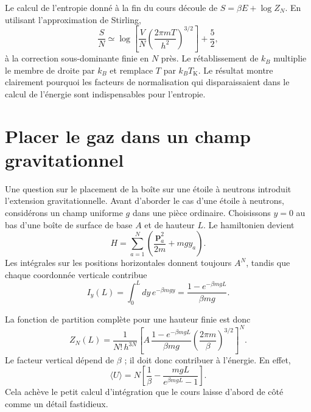 Le calcul de l’entropie donné à la fin du cours découle de \(S=\beta E+\log Z_N\). En utilisant l’approximation de Stirling,
\begin{equation}
 \frac{S}{N}
 \simeq
 \log\!\left[
  \frac{V}{N}
  \left(\frac{2\pi mT}{h^2}\right)^{3/2}
 \right]
 +\frac{5}{2},
 \label{eq:sm4-sackur-tetrode}
\end{equation}
à la correction sous-dominante finie en \(N\) près. Le rétablissement de \(k_B\) multiplie le membre de droite par \(k_B\) et remplace \(T\) par \(k_BT_{\mathrm K}\). Le résultat montre clairement pourquoi les facteurs de normalisation qui disparaissaient dans le calcul de l’énergie sont indispensables pour l’entropie.

\section{Placer le gaz dans un champ gravitationnel}

Une question sur le placement de la boîte sur une étoile à neutrons introduit l’extension gravitationnelle. Avant d’aborder le cas d’une étoile à neutrons, considérons un champ uniforme \(g\) dans une pièce ordinaire. Choisissons \(y=0\) au bas d’une boîte de surface de base \(A\) et de hauteur \(L\). Le hamiltonien devient
\begin{equation}
 H=\sum_{a=1}^{N}
 \left(\frac{\bm p_a^2}{2m}+mgy_a\right).
 \label{eq:sm4-gravity-hamiltonian}
\end{equation}
Les intégrales sur les positions horizontales donnent toujours \(A^N\), tandis que chaque coordonnée verticale contribue
\begin{equation}
 I_y(L)
 =\int_0^Ldy\,e^{-\beta mgy}
 =\frac{1-e^{-\beta mgL}}{\beta mg}.
 \label{eq:sm4-finite-height-integral}
\end{equation}

\begin{classroomqa}
\end{classroomqa}

La fonction de partition complète pour une hauteur finie est donc
\begin{equation}
 Z_N(L)
 =
 \frac{1}{N!\,h^{3N}}
 \left[
  A\,
  \frac{1-e^{-\beta mgL}}{\beta mg}
  \left(\frac{2\pi m}{\beta}\right)^{3/2}
 \right]^N.
 \label{eq:sm4-gravity-partition-finite}
\end{equation}
Le facteur vertical dépend de \(\beta\) ; il doit donc contribuer à l’énergie. En effet,
\begin{equation}
 \langle U\rangle
 =N\left[
  \frac{1}{\beta}
  -\frac{mgL}{e^{\beta mgL}-1}
 \right].
 \label{eq:sm4-finite-gravity-energy}
\end{equation}
Cela achève le petit calcul d’intégration que le cours laisse d’abord de côté comme un détail fastidieux.

